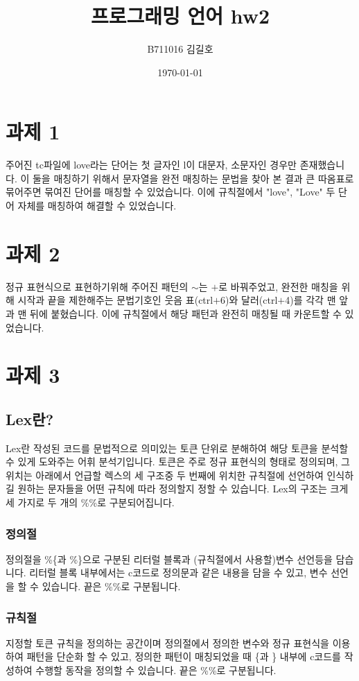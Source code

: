 \documentclass{article}
\title{프로그래밍 언어 hw2}
\author{B711016 김길호}
\date{\today}
\begin{document}
\maketitle
\newpage

\section{과제 1}
주어진 tc파일에 love라는 단어는 첫 글자인 l이 대문자, 소문자인 경우만 존재했습니다. 이 둘을 매칭하기 위해서 
문자열을 완전 매칭하는 문법을 찾아 본 결과 큰 따옴표로 묶어주면 묶여진 단어를 매칭할 수 있었습니다.
이에 규칙절에서 "love", "Love" 두 단어 자체를 매칭하여 해결할 수 있었습니다.\\

\section{과제 2}
정규 표현식으로 표현하기위해 주어진 패턴의 $\sim$는 $+$로 바꿔주었고, 완전한 매칭을 위해 시작과 끝을 제한해주는 문법기호인 웃음 표(ctrl$+$6)와 달러(ctrl$+$4)를 각각 맨 앞과 맨 뒤에 붙혔습니다. 
이에 규칙절에서 해당 패턴과 완전히 매칭될 때 카운트할 수 있었습니다.\\

\section{과제 3}
\subsection{Lex란?}
    Lex란 작성된 코드를 문법적으로 의미있는 토큰 단위로 분해하여 해당 토큰을 분석할 수 있게 도와주는 어휘 분석기입니다.
    토큰은 주로 정규 표현식의 형태로 정의되며, 그 위치는 아래에서 언급할 렉스의 세 구조중 두 번째에 위치한
    규칙절에 선언하여 인식하길 원하는 문자들을 어떤 규칙에 따라 정의할지 정할 수 있습니다. Lex의 구조는 크게 세 가지로 두 개의 \%\%로 구분되어집니다. 
    \subsubsection{정의절}
        정의절을 \%\{과 \%\}으로 구분된 리터럴 블록과 (규칙절에서 사용할)변수 선언등을 담습니다. 리터럴 블록 내부에서는 
        c코드로 정의문과 같은 내용을 담을 수 있고, 변수 선언을 할 수 있습니다. 끝은 \%\%로 구분됩니다.
    \subsubsection{규칙절}
        지정할 토큰 규칙을 정의하는 공간이며 정의절에서 정의한 변수와 정규 표현식을 이용하여 패턴을 단순화 할 수 있고,
        정의한 패턴이 매칭되었을 때 \{과 \} 내부에 c코드를 작성하여 수행할 동작을 정의할 수 있습니다. 끝은 \%\%로 구분됩니다.
\end{document}
